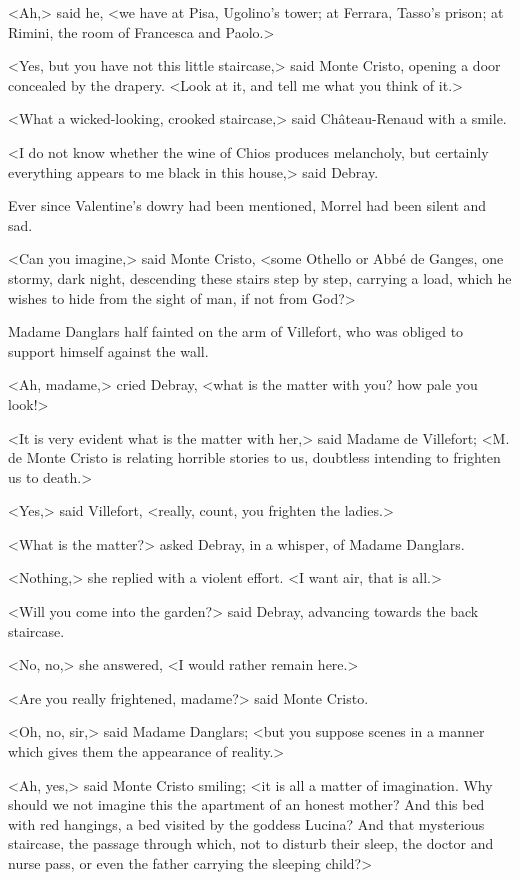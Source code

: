  <Ah,> said he, <we have at Pisa, Ugolino's tower; at Ferrara, Tasso's prison; at Rimini, the room of Francesca and Paolo.> 

 <Yes, but you have not this little staircase,> said Monte Cristo, opening a door concealed by the drapery. <Look at it, and tell me what you think of it.> 

 <What a wicked-looking, crooked staircase,> said Château-Renaud with a smile. 

 <I do not know whether the wine of Chios produces melancholy, but certainly everything appears to me black in this house,> said Debray. 

 Ever since Valentine's dowry had been mentioned, Morrel had been silent and sad. 

 <Can you imagine,> said Monte Cristo, <some Othello or Abbé de Ganges, one stormy, dark night, descending these stairs step by step, carrying a load, which he wishes to hide from the sight of man, if not from God?> 

 Madame Danglars half fainted on the arm of Villefort, who was obliged to support himself against the wall. 

 <Ah, madame,> cried Debray, <what is the matter with you? how pale you look!> 

 <It is very evident what is the matter with her,> said Madame de Villefort; <M. de Monte Cristo is relating horrible stories to us, doubtless intending to frighten us to death.> 

 <Yes,> said Villefort, <really, count, you frighten the ladies.> 

 <What is the matter?> asked Debray, in a whisper, of Madame Danglars. 

 <Nothing,> she replied with a violent effort. <I want air, that is all.> 

 <Will you come into the garden?> said Debray, advancing towards the back staircase. 

 <No, no,> she answered, <I would rather remain here.> 

 <Are you really frightened, madame?> said Monte Cristo. 

 <Oh, no, sir,> said Madame Danglars; <but you suppose scenes in a manner which gives them the appearance of reality.>

<Ah, yes,> said Monte Cristo smiling; <it is all a matter of imagination. Why should we not imagine this the apartment of an honest mother? And this bed with red hangings, a bed visited by the goddess Lucina? And that mysterious staircase, the passage through which, not to disturb their sleep, the doctor and nurse pass, or even the father carrying the sleeping child?> 


